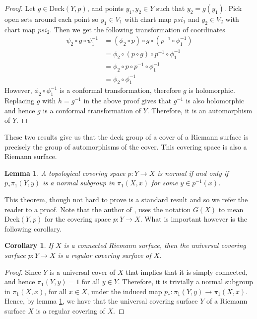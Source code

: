 \documentclass[11pt]{report}
\newtheorem{lemma}[thm]{Lemma}
\newtheorem{cor}[thm]{Corollary}
\theoremstyle{definition}
\begin{document}
\begin{proof}
  Let $g \in \text{Deck}(Y,p)$, and points $y_1,y_2 \in Y$ such that $y_2 = g(y_1)$. Pick open sets around each point so $y_1 \in V_1$ with chart map $psi_1$ and $y_2 \in V_2$ with chart map $psi_2$. Then we get the following transformation of coordinates
  \begin{align*}
    \psi_2\circ g \circ\psi_1^{-1} &= (\phi_2 \circ p) \circ g \circ (p^{-1}\circ \phi_1^{-1})\\
    &= \phi_2 \circ (p \circ g) \circ p^{-1}\circ \phi_1^{-1} \\
    &= \phi_2 \circ p \circ p^{-1}\circ \phi_1^{-1} \\
    &= \phi_2 \circ \phi_1^{-1}
  \end{align*}
  However, $\phi_2 \circ \phi_1^{-1}$ is a conformal transformation, therefore $g$ is holomorphic. Replacing $g$ with $h = g^{-1}$ in the above proof gives that $g^{-1}$ is also holomorphic and hence $g$ is a conformal transformation of $Y$. Therefore, it is an automorphism of $Y$.
\end{proof}
These two results give us that the deck group of a cover of a Riemann surface is precisely the group of automorphisms of the cover. This covering space is also a Riemann surface.
\begin{lemma}\cite[(p.71, Proposition 1.39)]{Hatchers}\label{LemmaOnCoveringSurfaces}
  A topological covering space $p:Y \rightarrow X$ is normal if and only if $p_*\pi_1(Y,y)$ is a normal subgroup in $\pi_1(X,x)$ for some $y \in p^{-1}(x)$.
\end{lemma}
This theorem, though not hard to prove is a standard result and so we refer the reader to a proof. Note that the author of \cite{Hatchers}, uses the notation $G(X)$ to mean $\text{Deck}(Y,p)$ for the covering space $p:Y \rightarrow X$. What is important however is the following corollary.
\begin{cor}
  If $X$ is a connected Riemann surface, then the universal covering surface $p:Y \rightarrow X$ is a regular covering surface of $X$.
\end{cor}
\begin{proof}
  Since $Y$ is a universal cover of $X$ that implies that it is simply connected, and hence $\pi_1(Y,y)=1$ for all $y\in Y$. Therefore, it is trivially a normal subgroup in $\pi_1(X,x)$, for all $x \in X$, under the induced map $p_*\colon \pi_1(Y,y) \rightarrow \pi_1(X,x)$. Hence, by lemma \ref{LemmaOnCoveringSurfaces}, we have that the universal covering surface $Y$ of a Riemann surface $X$ is a regular covering of $X$.
\end{proof}
\end{document}
